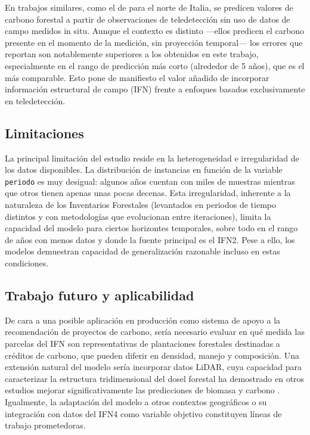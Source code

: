 En trabajos similares, como el de \citet{fasihi2024assessing} para el norte de Italia, se predicen valores de carbono forestal a partir de observaciones de teledetección sin uso de datos de campo medidos in situ. Aunque el contexto es distinto ---ellos predicen el carbono presente en el momento de la medición, sin proyección temporal--- los errores que reportan son notablemente superiores a los obtenidos en este trabajo, especialmente en el rango de predicción más corto (alrededor de 5 años), que es el más comparable. Esto pone de manifiesto el valor añadido de incorporar información estructural de campo (IFN) frente a enfoques basados exclusivamente en teledetección.

\subsection*{Limitaciones}

La principal limitación del estudio reside en la heterogeneidad e irregularidad de los datos disponibles. La distribución de instancias en función de la variable \texttt{periodo} es muy desigual: algunos años cuentan con miles de muestras mientras que otros tienen apenas unas pocas decenas. Esta irregularidad, inherente a la naturaleza de los Inventarios Forestales (levantados en periodos de tiempo distintos y con metodologías que evolucionan entre iteraciones), limita la capacidad del modelo para ciertos horizontes temporales, sobre todo en el rango de años con menos datos y donde la fuente principal es el IFN2. Pese a ello, los modelos demuestran capacidad de generalización razonable incluso en estas condiciones.

\subsection*{Trabajo futuro y aplicabilidad}

De cara a una posible aplicación en producción como sistema de apoyo a la recomendación de proyectos de carbono, sería necesario evaluar en qué medida las parcelas del IFN son representativas de plantaciones forestales destinadas a créditos de carbono, que pueden diferir en densidad, manejo y composición. Una extensión natural del modelo sería incorporar datos LiDAR, cuya capacidad para caracterizar la estructura tridimensional del dosel forestal ha demostrado en otros estudios mejorar significativamente las predicciones de biomasa y carbono \citep{nyakudanga_treemes}. Igualmente, la adaptación del modelo a otros contextos geográficos o su integración con datos del IFN4 como variable objetivo constituyen líneas de trabajo prometedoras.
